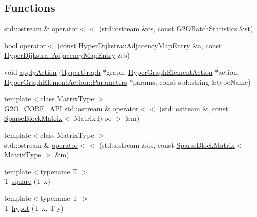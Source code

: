 \subsection*{Functions}
\begin{DoxyCompactItemize}
\item 
std\+::ostream \& \mbox{\hyperlink{namespaceg2o_aab743f811f4b7b6a6e724d64e26b450d}{operator$<$$<$}} (std\+::ostream \&os, const \mbox{\hyperlink{structg2o_1_1_g2_o_batch_statistics}{G2\+O\+Batch\+Statistics}} \&st)
\item 
bool \mbox{\hyperlink{namespaceg2o_a2a6eaf50f7bfb542915d123feee52f6a}{operator$<$}} (const \mbox{\hyperlink{structg2o_1_1_hyper_dijkstra_1_1_adjacency_map_entry}{Hyper\+Dijkstra\+::\+Adjacency\+Map\+Entry}} \&a, const \mbox{\hyperlink{structg2o_1_1_hyper_dijkstra_1_1_adjacency_map_entry}{Hyper\+Dijkstra\+::\+Adjacency\+Map\+Entry}} \&b)
\item 
void \mbox{\hyperlink{namespaceg2o_ac2ef8b73c930abdd15131f8fb02cd42f}{apply\+Action}} (\mbox{\hyperlink{classg2o_1_1_hyper_graph}{Hyper\+Graph}} $\ast$graph, \mbox{\hyperlink{classg2o_1_1_hyper_graph_element_action}{Hyper\+Graph\+Element\+Action}} $\ast$action, \mbox{\hyperlink{structg2o_1_1_hyper_graph_element_action_1_1_parameters}{Hyper\+Graph\+Element\+Action\+::\+Parameters}} $\ast$params, const std\+::string \&type\+Name)
\item 
{\footnotesize template$<$class Matrix\+Type $>$ }\\\mbox{\hyperlink{g2o__core__api_8h_a7a8d7648d6f1e26632566f335751d064}{G2\+O\+\_\+\+C\+O\+R\+E\+\_\+\+A\+PI}} std\+::ostream \& \mbox{\hyperlink{namespaceg2o_a0f97d92b12af077b9a7f5139b60bbf3e}{operator$<$$<$}} (std\+::ostream \&, const \mbox{\hyperlink{classg2o_1_1_sparse_block_matrix}{Sparse\+Block\+Matrix}}$<$ Matrix\+Type $>$ \&m)
\item 
{\footnotesize template$<$class Matrix\+Type $>$ }\\std\+::ostream \& \mbox{\hyperlink{namespaceg2o_a93a7a7ba5b97550aa30b946537663e05}{operator$<$$<$}} (std\+::ostream \&os, const \mbox{\hyperlink{classg2o_1_1_sparse_block_matrix}{Sparse\+Block\+Matrix}}$<$ Matrix\+Type $>$ \&m)
\item 
{\footnotesize template$<$typename T $>$ }\\T \mbox{\hyperlink{namespaceg2o_ada3127f4fe72b228407fabe23b72a50b}{square}} (T x)
\item 
{\footnotesize template$<$typename T $>$ }\\T \mbox{\hyperlink{namespaceg2o_a586ee8937cdc8de49303abd1611da387}{hypot}} (T x, T y)

\end{DoxyCompactItemize}
